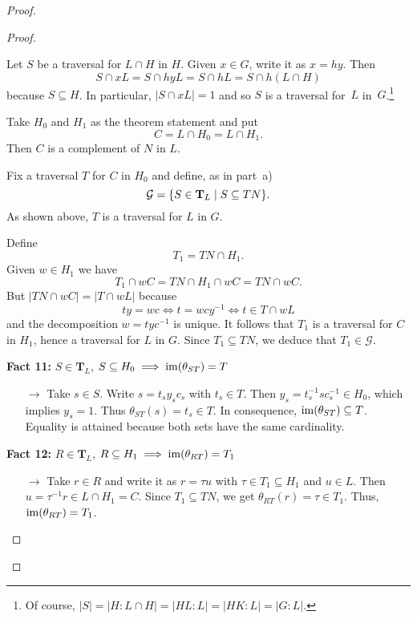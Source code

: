 \begin{solution}
\begin{proof}
\begin{proof}
\begin{enumerate}[\rm a)]
    Let $S$ be a traversal for $L\cap H$ in $H$. Given $x\in G$, write it as $x=hy$. Then
    $$
        S\cap xL = S\cap hyL = S\cap hL = S\cap h(L\cap H)
    $$
    because $S\subseteq H$. In particular, $|S\cap xL|=1$ and so $S$ is a traversal for~$L$ in~$G$.\footnote{Of course, $|S|=|H:L\cap H|=|HL:L|=|HK:L|=|G:L|$.}
    
    Take $H_0$ and $H_1$ as the theorem statement and put
    $$
        C=L\cap H_0=L\cap H_1.
    $$
    Then $C$ is a complement of $N$ in $L$.
    
    Fix a traversal $T$ for $C$ in $H_0$ and define, as in part~a)
    $$
        \mathcal G = \{S\in\mathbf T_L\mid S\subseteq TN\}.
    $$
    As shown above, $T$ is a traversal for $L$ in $G$.
    
    Define
    $$
        T_1 = TN\cap H_1.
    $$
    Given $w\in H_1$ we have
    $$
        T_1\cap wC = TN\cap H_1\cap wC = TN\cap wC.
    $$
    But $|TN\cap wC|=|T\cap wL|$ because
    $$
        ty=wc \iff t=wcy^{-1}\iff t\in T\cap wL
    $$
    and the decomposition $w=tyc^{-1}$ is unique. It follows that $T_1$ is a traversal for $C$ in $H_1$, hence a traversal for $L$ in $G$. Since $T_1\subseteq TN$, we deduce that $T_1\in\mathcal G$.

    \medskip

    \textbf{Fact 11:} $S\in\mathbf T_L$, $S\subseteq H_0\implies\operatorname{im}(\theta_{ST})=T$

    {\small
    \begin{enumerate}
        \item[$\to$] Take $s\in S$. Write $s=t_sy_sc_s$ with $t_s\in T$. Then $y_s=t_s^{-1}sc_s^{-1}\in H_0$, which implies $y_s=1$. Thus $\theta_{ST}(s) = t_s\in T$. In consequence, $\operatorname{im}(\theta_{ST})\subseteq T$. Equality is attained because both sets have the same cardinality.
    \end{enumerate}
    }

    \textbf{Fact 12:} $R\in\mathbf T_L$, $R\subseteq H_1\implies\operatorname{im}(\theta_{RT})=T_1$

    {\small
    \begin{enumerate}
        \item[$\to$] Take $r\in R$ and write it as $r=\tau u$ with $\tau\in T_1\subseteq H_1$ and $u\in L$. Then $u=\tau^{-1}r\in L\cap H_1=C$. Since $T_1\subseteq TN$, we get $\theta_{RT}(r)=\tau\in T_1$. Thus, $\operatorname{im}(\theta_{RT})=T_1$.
    \end{enumerate}
    }

    \medskip
    

\end{enumerate}
\end{proof}
\end{proof}
\end{solution}
